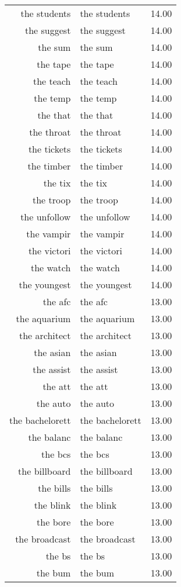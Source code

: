 \begin{table}[ht]
\begin{tabular}{rlr}
  the students & the students & 14.00 \\ 
  the suggest & the suggest & 14.00 \\ 
  the sum & the sum & 14.00 \\ 
  the tape & the tape & 14.00 \\ 
  the teach & the teach & 14.00 \\ 
  the temp & the temp & 14.00 \\ 
  the that & the that & 14.00 \\ 
  the throat & the throat & 14.00 \\ 
  the tickets & the tickets & 14.00 \\ 
  the timber & the timber & 14.00 \\ 
  the tix & the tix & 14.00 \\ 
  the troop & the troop & 14.00 \\ 
  the unfollow & the unfollow & 14.00 \\ 
  the vampir & the vampir & 14.00 \\ 
  the victori & the victori & 14.00 \\ 
  the watch & the watch & 14.00 \\ 
  the youngest & the youngest & 14.00 \\ 
  the afc & the afc & 13.00 \\ 
  the aquarium & the aquarium & 13.00 \\ 
  the architect & the architect & 13.00 \\ 
  the asian & the asian & 13.00 \\ 
  the assist & the assist & 13.00 \\ 
  the att & the att & 13.00 \\ 
  the auto & the auto & 13.00 \\ 
  the bachelorett & the bachelorett & 13.00 \\ 
  the balanc & the balanc & 13.00 \\ 
  the bcs & the bcs & 13.00 \\ 
  the billboard & the billboard & 13.00 \\ 
  the bills & the bills & 13.00 \\ 
  the blink & the blink & 13.00 \\ 
  the bore & the bore & 13.00 \\ 
  the broadcast & the broadcast & 13.00 \\ 
  the bs & the bs & 13.00 \\ 
  the bum & the bum & 13.00 \\ 

\end{tabular}
\end{table}
